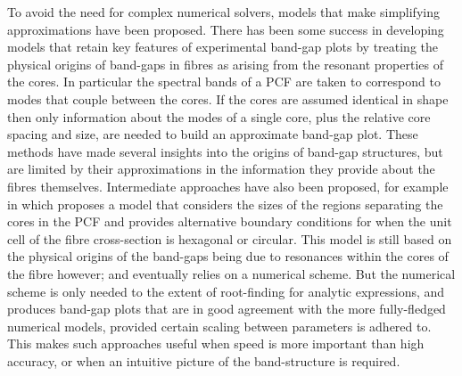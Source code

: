 To avoid the need for complex numerical solvers, models that make simplifying approximations have been proposed.
There has been some success in developing models that retain key features of experimental band-gap plots by treating the physical origins of band-gaps in fibres as arising from the resonant properties of the cores.
In particular the spectral bands of a PCF are taken to correspond to modes that couple between the cores.
If the cores are assumed identical in shape then only information about the modes of a single core, plus the relative core spacing and size, are needed to build an approximate band-gap plot.
These methods have made several insights into the origins of band-gap structures, but are limited by their approximations in the information they provide about the fibres themselves.
Intermediate approaches have also been proposed, for example in \cite{birks2006approximate} which proposes a model that considers the sizes of the regions separating the cores in the PCF and provides alternative boundary conditions for when the unit cell of the fibre cross-section is hexagonal or circular.
This model is still based on the physical origins of the band-gaps being due to resonances within the cores of the fibre however; and eventually relies on a numerical scheme.
But the numerical scheme is only needed to the extent of root-finding for analytic expressions, and produces band-gap plots that are in good agreement with the more fully-fledged numerical models, provided certain scaling between parameters is adhered to.
This makes such approaches useful when speed is more important than high accuracy, or when an intuitive picture of the band-structure is required. \newline

